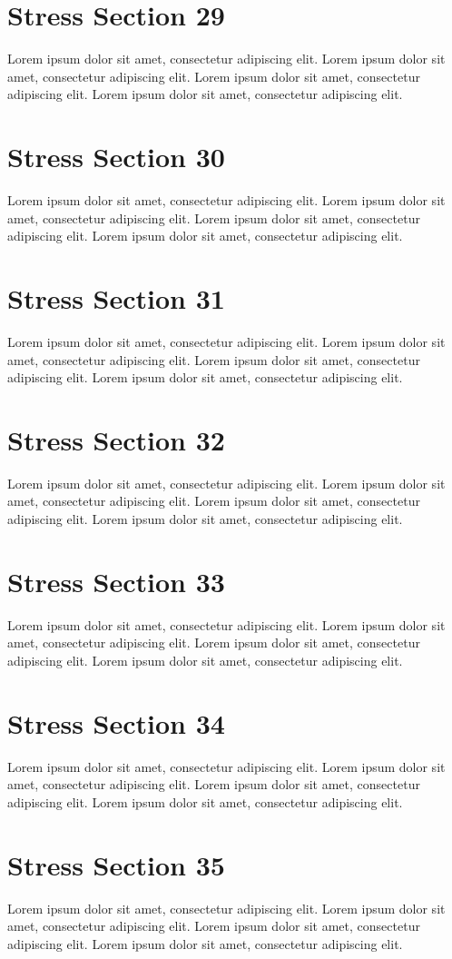 \documentclass{article}
\begin{document}
\section{Stress Section 29}
Lorem ipsum dolor sit amet, consectetur adipiscing elit. Lorem ipsum dolor sit amet, consectetur adipiscing elit. Lorem ipsum dolor sit amet, consectetur adipiscing elit. Lorem ipsum dolor sit amet, consectetur adipiscing elit. \newpage
\section{Stress Section 30}
Lorem ipsum dolor sit amet, consectetur adipiscing elit. Lorem ipsum dolor sit amet, consectetur adipiscing elit. Lorem ipsum dolor sit amet, consectetur adipiscing elit. Lorem ipsum dolor sit amet, consectetur adipiscing elit. \newpage
\section{Stress Section 31}
Lorem ipsum dolor sit amet, consectetur adipiscing elit. Lorem ipsum dolor sit amet, consectetur adipiscing elit. Lorem ipsum dolor sit amet, consectetur adipiscing elit. Lorem ipsum dolor sit amet, consectetur adipiscing elit. \newpage
\section{Stress Section 32}
Lorem ipsum dolor sit amet, consectetur adipiscing elit. Lorem ipsum dolor sit amet, consectetur adipiscing elit. Lorem ipsum dolor sit amet, consectetur adipiscing elit. Lorem ipsum dolor sit amet, consectetur adipiscing elit. \newpage
\section{Stress Section 33}
Lorem ipsum dolor sit amet, consectetur adipiscing elit. Lorem ipsum dolor sit amet, consectetur adipiscing elit. Lorem ipsum dolor sit amet, consectetur adipiscing elit. Lorem ipsum dolor sit amet, consectetur adipiscing elit. \newpage
\section{Stress Section 34}
Lorem ipsum dolor sit amet, consectetur adipiscing elit. Lorem ipsum dolor sit amet, consectetur adipiscing elit. Lorem ipsum dolor sit amet, consectetur adipiscing elit. Lorem ipsum dolor sit amet, consectetur adipiscing elit. \newpage
\section{Stress Section 35}
Lorem ipsum dolor sit amet, consectetur adipiscing elit. Lorem ipsum dolor sit amet, consectetur adipiscing elit. Lorem ipsum dolor sit amet, consectetur adipiscing elit. Lorem ipsum dolor sit amet, consectetur adipiscing elit. \newpage
\end{document}
